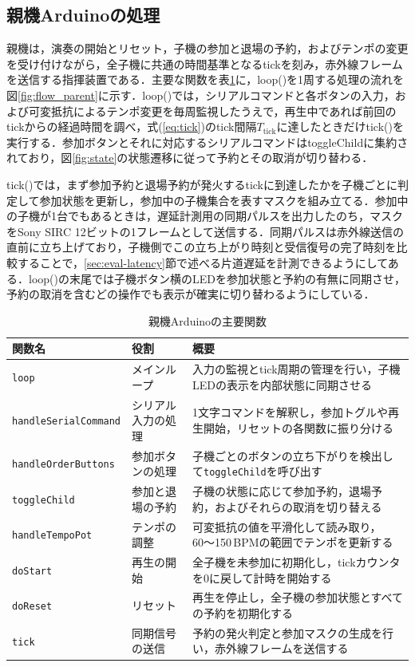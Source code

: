 \subsection{親機Arduinoの処理}

親機は，演奏の開始とリセット，子機の参加と退場の予約，およびテンポの変更を受け付けながら，全子機に共通の時間基準となるtickを刻み，赤外線フレームを送信する指揮装置である．主要な関数を表\ref{tab:func_parent}に，loop()を1周する処理の流れを図\ref{fig:flow_parent}に示す．loop()では，シリアルコマンドと各ボタンの入力，および可変抵抗によるテンポ変更を毎周監視したうえで，再生中であれば前回のtickからの経過時間を調べ，式(\ref{eq:tick})のtick間隔$T_\mathrm{tick}$に達したときだけtick()を実行する．参加ボタンとそれに対応するシリアルコマンドはtoggleChildに集約されており，図\ref{fig:state}の状態遷移に従って予約とその取消が切り替わる．

tick()では，まず参加予約と退場予約が発火するtickに到達したかを子機ごとに判定して参加状態を更新し，参加中の子機集合を表すマスクを組み立てる．参加中の子機が1台でもあるときは，遅延計測用の同期パルスを出力したのち，マスクをSony SIRC 12ビットの1フレームとして送信する．同期パルスは赤外線送信の直前に立ち上げており，子機側でこの立ち上がり時刻と受信復号の完了時刻を比較することで，\ref{sec:eval-latency}節で述べる片道遅延を計測できるようにしてある．loop()の末尾では子機ボタン横のLEDを参加状態と予約の有無に同期させ，予約の取消を含むどの操作でも表示が確実に切り替わるようにしている．

\begin{table}[tb]
\caption{親機Arduinoの主要関数}
\label{tab:func_parent}
\begin{center}
\small
\begin{tabular}{llp{15em}}
\hline
関数名 & 役割 & 概要 \\
\hline
\texttt{loop} & メインループ & 入力の監視とtick周期の管理を行い，子機LEDの表示を内部状態に同期させる \\
\texttt{handleSerialCommand} & シリアル入力の処理 & 1文字コマンドを解釈し，参加トグルや再生開始，リセットの各関数に振り分ける \\
\texttt{handleOrderButtons} & 参加ボタンの処理 & 子機ごとのボタンの立ち下がりを検出して\texttt{toggleChild}を呼び出す \\
\texttt{toggleChild} & 参加と退場の予約 & 子機の状態に応じて参加予約，退場予約，およびそれらの取消を切り替える \\
\texttt{handleTempoPot} & テンポの調整 & 可変抵抗の値を平滑化して読み取り，60〜150\,BPMの範囲でテンポを更新する \\
\texttt{doStart} & 再生の開始 & 全子機を未参加に初期化し，tickカウンタを0に戻して計時を開始する \\
\texttt{doReset} & リセット & 再生を停止し，全子機の参加状態とすべての予約を初期化する \\
\texttt{tick} & 同期信号の送信 & 予約の発火判定と参加マスクの生成を行い，赤外線フレームを送信する \\
\hline
\end{tabular}
\end{center}
\end{table}


